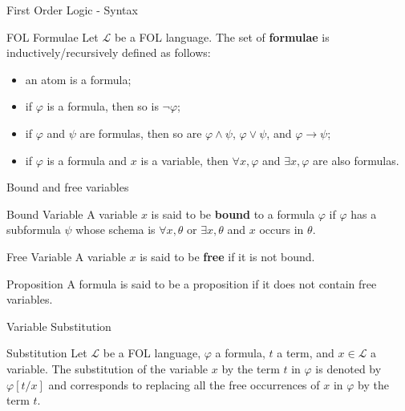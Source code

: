 \documentclass[aspectratio=169]{beamer}
\begin{document}
\begin{slide}{First Order Logic - Syntax}
 
 \begin{block}{FOL Formulae}  
  Let $\mathcal{L}$ be a FOL language. The set of {\bf formulae} is inductively/recursively defined  as follows:
  \begin{itemize}
  \item an atom is a formula;
  \item if $\varphi$ is a formula, then so is $\neg\varphi$;
  \item if $\varphi$ and $\psi$ are formulas, then so are $\varphi \land \psi$, $\varphi \lor \psi$, and $\varphi \to \psi$;
  \item if $\varphi$ is a formula and $x$ is a variable, then $\forall x, \varphi$ and $\exists x, \varphi$ are also formulas.
  \end{itemize}
  \end{block}

\end{slide}



\begin{slide}{Bound and free variables}
  \begin{block}{Bound Variable}
  A variable $x$ is said to be {\bf bound} to a formula $\varphi$ if $\varphi$ has a subformula $\psi$ whose schema is $\forall x, \theta$ or $\exists x, \theta$ and $x$ occurs in $\theta$. 
  \end{block}
  \begin{block}{Free Variable}
  A variable $x$ is said to be {\bf free} if it is not bound.  
  \end{block}
  \begin{block}{Proposition}
  A formula is said to be a proposition if it does not contain free variables.  
  \end{block}
\end{slide}



\begin{slide}{Variable Substitution}

\begin{block}{Substitution}
Let $\mathcal{L}$ be a FOL language, $\varphi$ a formula, $t$ a term, and $x \in \mathcal{L}$ a variable. The substitution of the variable $x$ by the term $t$ in $\varphi$ is denoted by $\varphi[t/x]$ and corresponds to replacing all the free occurrences of $x$ in $\varphi$ by the term $t$.
\end{block}

\end{slide}
\end{document}
